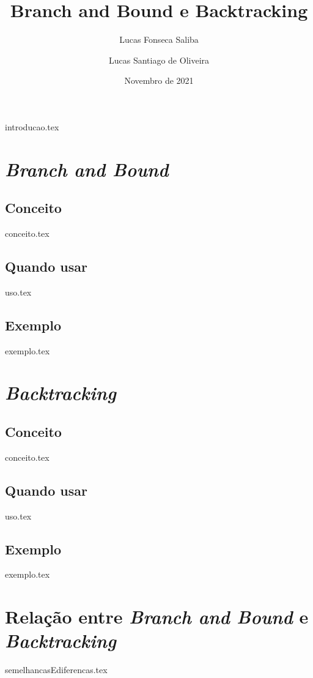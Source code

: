 \documentclass{article}
\title{Branch and Bound e Backtracking}
\author{Lucas Fonseca Saliba \and Lucas Santiago de Oliveira}
\date{Novembro de 2021}
\begin{document}
\maketitle
\vspace{1cm}
\tableofcontents
\newpage

{introducao.tex}

\section{\emph{Branch and Bound}}
\subsection{Conceito}
{conceito.tex}

\subsection{Quando usar}
{uso.tex}

\subsection{Exemplo}
{exemplo.tex}

\section{\emph{Backtracking}}
\subsection{Conceito}
{conceito.tex}

\subsection{Quando usar}
{uso.tex}

\subsection{Exemplo}
{exemplo.tex}

\section{Relação entre \emph{Branch and Bound} e \emph{Backtracking}}
{semelhancasEdiferencas.tex}
\end{document}
